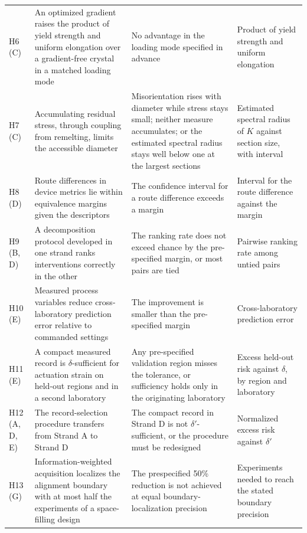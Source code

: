 \documentclass[11pt]{article}
\theoremstyle{definition}
\begin{document}
\begin{small}
\begin{longtable}{@{}p{1.2cm}p{4.1cm}p{4.3cm}p{3.7cm}@{}}
H6 (C) & An optimized gradient raises the product of yield strength and uniform elongation over a gradient-free crystal in a matched loading mode & No advantage in the loading mode specified in advance & Product of yield strength and uniform elongation \\
H7 (C) & Accumulating residual stress, through coupling from remelting, limits the accessible diameter & Misorientation rises with diameter while stress stays small; neither measure accumulates; or the estimated spectral radius stays well below one at the largest sections & Estimated spectral radius of $K$ against section size, with interval \\
H8 (D) & Route differences in device metrics lie within equivalence margins given the descriptors & The confidence interval for a route difference exceeds a margin & Interval for the route difference against the margin \\
H9 (B, D) & A decomposition protocol developed in one strand ranks interventions correctly in the other & The ranking rate does not exceed chance by the pre-specified margin, or most pairs are tied & Pairwise ranking rate among untied pairs \\
H10 (E) & Measured process variables reduce cross-laboratory prediction error relative to commanded settings & The improvement is smaller than the pre-specified margin & Cross-laboratory prediction error \\
H11 (E) & A compact measured record is $\delta$-sufficient for actuation strain on held-out regions and in a second laboratory & Any pre-specified validation region misses the tolerance, or sufficiency holds only in the originating laboratory & Excess held-out risk against $\delta$, by region and laboratory \\
H12 (A, D, E) & The record-selection procedure transfers from Strand A to Strand D & The compact record in Strand D is not $\delta'$-sufficient, or the procedure must be redesigned & Normalized excess risk against $\delta'$ \\
H13 (G) & Information-weighted acquisition localizes the alignment boundary with at most half the experiments of a space-filling design & The prespecified 50\% reduction is not achieved at equal boundary-localization precision & Experiments needed to reach the stated boundary precision \\
\end{longtable}
\end{small}

\end{document}
